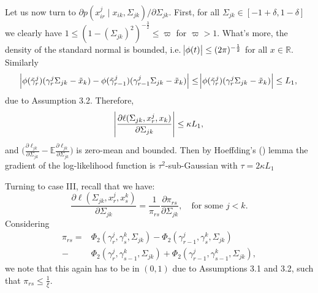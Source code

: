 \begin{condition}
    Let us now turn to $\partial p(x^j_{ir} \mid x_{ik}, \Sigma_{jk})/\partial \Sigma_{jk}$. First, for all $\Sigma_{jk} \in [-1+\delta, 1-\delta]$ we clearly have $1 \leq (1-(\Sigma_{jk})^2)^{-\frac{3}{2}} \leq \varpi$ for $\varpi > 1$. What's more, the density of the standard normal is bounded, i.e. $\abs{\phi(t)} \leq (2\pi)^{-\frac{1}{2}}$ for all $x \in \mathbb{R}$. Similarly
    \begin{equation*}
        \abs{\phi({\Tilde{\gamma}}^j_{r})({\gamma}^j_r\Sigma_{jk} - {\Tilde{x}}_{k}) - \phi({\Tilde{\gamma}}^j_{r-1})({\gamma}^j_{r-1}\Sigma_{jk} - {\Tilde{x}}_{k})} \leq  \abs{\phi({\Tilde{\gamma}}^j_{r})({\gamma}^j_r\Sigma_{jk} - {\Tilde{x}}_{k})} \leq L_1,
    \end{equation*} 
    due to Assumption 3.2. %
    Therefore, 
    \begin{equation*}
        \abs{\frac{\partial\ell(\Sigma_{jk}, x^j_r,x_k)}{\partial \Sigma_{jk}}} \leq \kappa L_1, 
    \end{equation*}
    and $\Big(\frac{\partial\ell_{jk}}{\partial \Sigma_{jk}} - \mathbb{E}\frac{\partial\ell_{jk}}{\partial \Sigma_{jk}} \Big)$ is zero-mean and bounded. Then by Hoeffding's (\citeyear{Hoeffding63}) lemma  the gradient of the log-likelihood function is $\tau^2$-sub-Gaussian with $\tau = 2\kappa L_1$

    Turning to case III, recall that we have:
    \begin{equation*}
        \frac{\partial \ell(\Sigma_{jk}, x^j_r,x^k_s)}{\partial \Sigma_{jk}} = \frac{1}{\pi_{rs}} \frac{\partial \pi_{rs}}{\partial \Sigma_{jk}}, \quad \text{for some }j<k.  
    \end{equation*}
    Considering
    \begin{align*}
        \pi_{rs} = &\Phi_2({\gamma}^j_r, {\gamma}^k_s, \Sigma_{jk}) - \Phi_2({\gamma}^j_{r-1}, {\gamma}^k_s, \Sigma_{jk}) \\
        - &\Phi_2({\gamma}^j_r, {\gamma}^k_{s-1}, \Sigma_{jk}) + \Phi_2({\gamma}^j_{r-1}, {\gamma}^k_{s-1}, \Sigma_{jk}),
    \end{align*}
    we note that this again has to be in $(0,1)$ due to Assumptions 3.1 and 3.2,
    such that $\pi_{rs} \leq \frac{1}{\xi}$. %
    

\end{condition}
